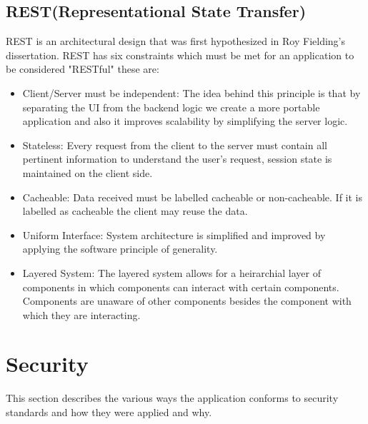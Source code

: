 \subsection{REST(Representational State Transfer)}
REST is an architectural design that was first hypothesized in Roy Fielding's dissertation\cite{Fielding}.  REST has six constraints which must be met for an application to be considered "RESTful" these are:
\begin{itemize}
  \item Client/Server must be independent: The idea behind this principle is that by separating the UI from the backend logic we create a more portable application and also it improves scalability by simplifying the server logic.
  \item Stateless:  Every request from the client to the server must contain all pertinent information to understand the user's request, session state is maintained on the client side.
  \item Cacheable: Data received must be labelled cacheable or non-cacheable.  If it is labelled as cacheable the client may reuse the data.
  \item Uniform Interface: System architecture is simplified and improved by applying the software principle of generality.
  \item Layered System: The layered system allows for a heirarchial layer of components in which components can interact with certain components.  Components are unaware of other components besides the component with which they are interacting.
\end{itemize}
\section{Security}
This section describes the various ways the application conforms to security standards and how they were applied and why.
